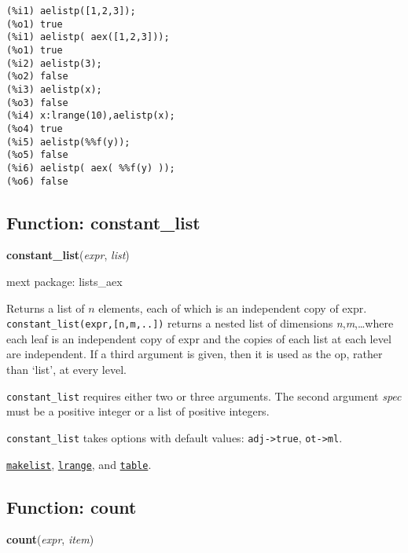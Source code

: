 \documentclass[]{article}
\begin{document}

\begin{Verbatim}[frame=single]
(%i1) aelistp([1,2,3]);
(%o1) true
(%i1) aelistp( aex([1,2,3]));
(%o1) true
(%i2) aelistp(3);
(%o2) false
(%i3) aelistp(x);
(%o3) false
(%i4) x:lrange(10),aelistp(x);
(%o4) true
(%i5) aelistp(%%f(y));
(%o5) false
(%i6) aelistp( aex( %%f(y) ));
(%o6) false
\end{Verbatim}


\subsection{Function: constant\_list\label{sec:constant_list}}
\hypertarget{constant_list}{}
{\bf constant\_list}({\it expr}, {\it list})


\noindent mext package: lists\_aex



\vspace{5 pt}
Returns a list of $n$ elements, each of which is an independent copy of expr. \verb#constant_list(expr,[n,m,..])# returns a nested list of dimensions {\it n},{\it m},\ldots where each leaf is an independent copy of expr and the copies of each list at each level are independent. If a third argument 
is given, then it is used as the op, rather than `list', at every level. 

\vspace{5 pt}

   {\tt constant\_list} requires either two or three arguments.
    The second argument {\it spec} must be a positive integer or a list of positive integers.


\vspace{5 pt}

{\tt constant\_list} takes options with default values: {\tt adj->true}, {\tt ot->ml}.
\vspace{5 pt}


  \hyperlink{makelist}{{\tt makelist}}, \hyperlink{lrange}{{\tt lrange}}, and \hyperlink{table}{{\tt table}}.

\vspace{5 pt}


\subsection{Function: count\label{sec:count}}
\hypertarget{count}{}
{\bf count}({\it expr}, {\it item})
\end{document}
